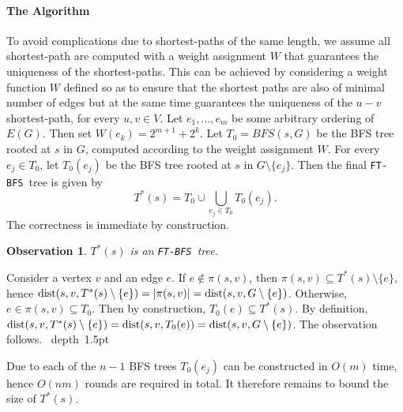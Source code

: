 \documentclass[12pt]{article}
\newtheorem{observation}[theorem]{Observation}
\newcommand{\dist}{\mbox{\rm dist}}
\def\Proof{\par\noindent{\bf Proof:~}}
\def\blackslug{\hbox{\hskip 1pt \vrule width 4pt height 8pt
    depth 1.5pt \hskip 1pt}}
\def\QED{\quad\blackslug\lower 8.5pt\null\par}
\def\FTBFS{\mbox{\tt FT-BFS}}
\begin{document}
\paragraph{The Algorithm}
To avoid complications due to shortest-paths of the same length,
we assume all shortest-path are computed with a weight assignment $W$
that guarantees the uniqueness of the shortest-paths. This can be achieved
by considering
a weight function $W$ defined so as to ensure that the shortest paths are also
of minimal number of edges but at the same time guarantees the uniqueness
of the $u-v$ shortest-path, for every $u,v \in V$. Let $e_1, \ldots, e_{m}$ be some arbitrary ordering of $E(G)$. Then set $W(e_k) = 2^{m+1} + 2^k$.
Let $T_0=BFS(s, G)$ be the BFS tree rooted at $s$ in $G$, computed according
to the weight assignment $W$. For every $e_j \in T_0$, let $T_0(e_j)$ be the
BFS tree rooted at $s$ in $G \setminus \{e_{j}\}$.
Then the final \FTBFS\ tree is given by
$$T^{*}(s)=T_0\cup \bigcup_{e_j \in T_0} T_0(e_j).$$
The correctness is immediate by construction.
\begin{observation}
\label{obs:correctness}
$T^{*}(s)$ is an \FTBFS\ tree.
\end{observation}
\def\APPENDUPCORRECT{
\Proof
Consider a vertex $v$ and an edge $e$.
If $e \notin \pi(s, v)$,
then $\pi(s, v) \subseteq T^{*}(s)\setminus\{e\}$, hence $\dist(s, v, T^{*}(s) \setminus \{e\})=|\pi(s, v)|=\dist(s, v, G \setminus \{e\})$. Otherwise, $e \in \pi(s, v) \subseteq T_0$. Then by construction, $T_0(e) \subseteq T^{*}(s)$. By definition, $\dist(s, v, T^*(s) \setminus \{e\})=\dist(s, v, T_0(e))=\dist(s, v, G \setminus \{e\})$. The observation follows.
\QED
}\APPENDUPCORRECT


Due to \cite{TH99} each of the $n-1$ BFS trees $T_0(e_j)$ can be constructed in $O(m)$ time, hence $O(n m)$ rounds are required in total.
It therefore remains to bound the size of $T^{*}(s)$.
\end{document}
